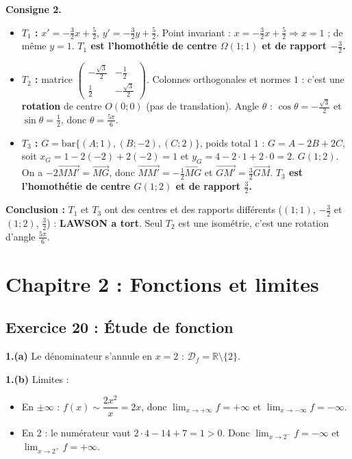 \documentclass[11pt,a4paper]{article}
\newcommand{\vect}[1]{\overrightarrow{#1}}
\newcommand{\R}{\mathbb{R}}
\begin{document}
\textbf{Consigne 2.}
\begin{itemize}
  \item \textbf{$T_1$ :} $x'=-\frac32x+\frac52$, $y'=-\frac32y+\frac52$. Point invariant : $x=-\frac32x+\frac52\Rightarrow x=1$ ;
  de m\^eme $y=1$. \textbf{$T_1$ est l'homoth\'etie de centre $\Omega(1;1)$ et de rapport $-\frac32$.}
  \item \textbf{$T_2$ :} matrice $\begin{pmatrix}-\frac{\sqrt3}{2}&-\frac12\\ \frac12&-\frac{\sqrt3}{2}\end{pmatrix}$.
  Colonnes orthogonales et normes $1$ : c'est une \textbf{rotation} de centre $O(0;0)$ (pas de translation).
  Angle $\theta$ : $\cos\theta=-\frac{\sqrt3}{2}$ et $\sin\theta=\frac12$, donc \textbf{$\theta=\frac{5\pi}{6}$}.
  \item \textbf{$T_3$ :} $G=\mathrm{bar}\{(A;1),(B;-2),(C;2)\}$, poids total $1$ : $G=A-2B+2C$, soit
  $x_G=1-2(-2)+2(-2)=1$ et $y_G=4-2\cdot1+2\cdot0=2$.
  \textbf{$G(1;2)$}. On a $-2\vect{MM'}=\vect{MG}$, donc $\vect{MM'}=-\frac12\vect{MG}$ et $\vect{GM'}=\frac32\vect{GM}$.
  \textbf{$T_3$ est l'homoth\'etie de centre $G(1;2)$ et de rapport $\frac32$.}
\end{itemize}
\textbf{Conclusion :} $T_1$ et $T_3$ ont des centres et des rapports diff\'erents ($(1;1)$, $-\frac32$ et $(1;2)$, $\frac32$) :
\textbf{LAWSON a tort}. Seul $T_2$ est une isom\'etrie, c'est une rotation d'angle $\frac{5\pi}{6}$.

\section{Chapitre 2 : Fonctions et limites}

\subsection{Exercice 20 : \'Etude de fonction}

\textbf{1.(a)} Le d\'enominateur s'annule en $x=2$ : $\mathcal D_f=\R\setminus\{2\}$.

\textbf{1.(b)} Limites :
\begin{itemize}
  \item En $\pm\infty$ : $f(x)\sim\dfrac{2x^2}{x}=2x$, donc $\lim_{x\to+\infty}f=+\infty$ et $\lim_{x\to-\infty}f=-\infty$.
  \item En $2$ : le num\'erateur vaut $2\cdot4-14+7=1>0$. Donc $\lim_{x\to2^-}f=-\infty$ et $\lim_{x\to2^+}f=+\infty$.
\end{itemize}
\end{document}
